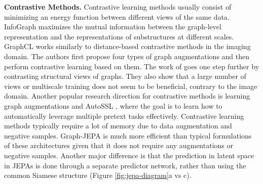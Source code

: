 \documentclass{article} \usepackage{iclr2024_conference,times}
\begin{document}
\textbf{Contrastive Methods.} Contrastive learning methods usually consist of minimizing an energy function \citep{hinton2002training,gutmann2010noise} between different views of the same data. InfoGraph \citep{sun2019infograph} maximizes the mutual information between the graph-level representation and the representations of substructures at different scales. GraphCL \citep{you2020graph} works similarly to distance-based contrastive methods in the imaging domain. The authors first propose four types of graph augmentations and then perform contrastive learning based on them. The work of \citet{hassani2020contrastive} goes one step further by contrasting structural views of graphs. They also show that a large number of views or multiscale training does not seem to be beneficial, contrary to the image domain. Another popular research direction for contrastive methods is learning graph augmentations \citep{suresh2021adversarial} and AutoSSL \citep{jin2021automated}, where the goal is to learn how to automatically leverage multiple pretext tasks effectively. Contrastive learning methods typically require a lot of memory due to data augmentation and negative samples. Graph-JEPA is much more efficient than typical formulations of these architectures given that it does not require any augmentations or negative samples. Another major difference is that the prediction in latent space in JEPAs is done through a separate predictor network, rather than using the common Siamese structure \citep{bromley1993signature}(Figure \ref{fig:jepa-diagram}a vs c).
\end{document}
